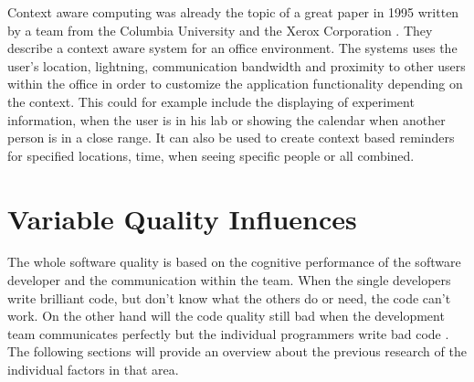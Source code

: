 Context aware computing was already the topic of a great paper in 1995 written by a team from the Columbia University and the Xerox Corporation \cite{schilit1994context}. They describe a context aware system for an office environment. The systems uses the user's location, lightning, communication bandwidth and proximity to other users within the office in order to customize the application functionality depending on the context. This could for example include the displaying of experiment information, when the user is in his lab or showing the calendar when another person is in a close range. It can also be used to create context based reminders for specified locations, time, when seeing specific people or all combined. 

\section{Variable Quality Influences}
The whole software quality is based on the cognitive performance of the software developer and the communication within the team. 
When the single developers write brilliant code, but don't know what the others do or need, the code can't work. On the other hand will the code quality still bad when the development team communicates perfectly but the individual programmers write bad code \cite{moe2010teamwork}. The following sections will provide an overview about the previous research of the individual factors in that area. 

